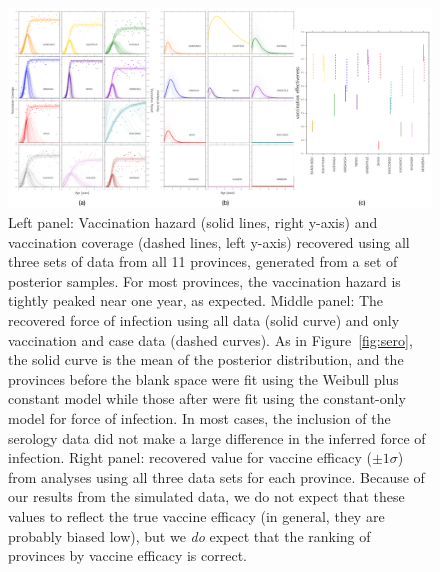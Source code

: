 \documentclass[nofootinbib,aps,pre,twocolumn,superscriptaddress,showkeys,showpacs]{revtex4-1}
\begin{document}
\begin{figure}
\includegraphics[width=\textwidth,angle=0]{figures/VacFOIveff-crop.pdf}
\caption{\label{fig:foivaccveff} Left panel: Vaccination hazard (solid lines, right y-axis) and vaccination coverage (dashed lines, left y-axis) recovered using all three sets of data from all 11 provinces, generated from a set of posterior samples. For most provinces, the vaccination hazard is tightly peaked near one year, as expected. Middle panel: The recovered force of infection using all data (solid curve) and only vaccination and case data (dashed curves). As in Figure~\ref{fig:sero}, the solid curve is the mean of the posterior distribution, and the provinces before the blank space were fit using the Weibull plus constant model while those after were fit using the constant-only model for force of infection. In most cases, the inclusion of the serology data did not make a large difference in the inferred force of infection. Right panel: recovered value for vaccine efficacy ($\pm 1\sigma$) from analyses using all three data sets for each province. Because of our results from the simulated data, we do not expect that these values to reflect the true vaccine efficacy (in general, they are probably biased low), but we \emph{do} expect that the ranking of provinces by vaccine efficacy is correct.}
\end{figure}
\end{document}
